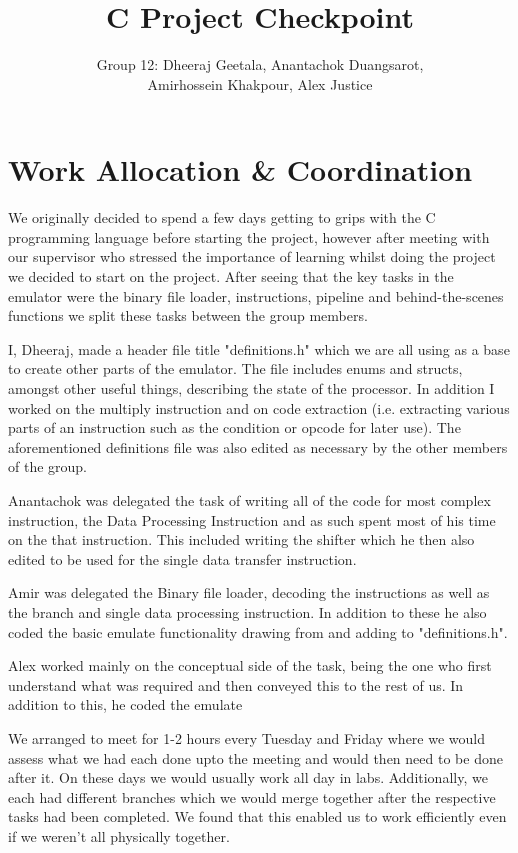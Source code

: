 \documentclass[a4paper,12pt]{article}
\begin{document}
\title{ C Project Checkpoint }
\author{Group 12: Dheeraj Geetala, Anantachok Duangsarot, \\Amirhossein Khakpour, Alex Justice}
\predate{}
\date{}
\postdate{}
\maketitle

\section{Work Allocation \& Coordination}
We originally decided to spend a few days getting to grips with the C programming language before starting the project, however after meeting with our supervisor who stressed the importance of learning whilst doing the project we decided to start on the project. After seeing that the key tasks in the emulator were the binary file loader, instructions, pipeline and behind-the-scenes functions we split these tasks between the group members.

I, Dheeraj, made a header file title "definitions.h" which we are all using as a base to create other parts of the emulator. The file includes enums and structs, amongst other useful things, describing the state of the processor. In addition I worked on the multiply instruction and on code extraction (i.e. extracting various parts of an instruction such as the condition or opcode for later use). The aforementioned definitions file was also edited as necessary by the other members of the group. 

Anantachok was delegated the task of writing all of the code for most complex instruction, the Data Processing Instruction and as such spent most of his time on the that instruction. This included writing the shifter which he then also edited to be used for the single data transfer instruction.

Amir was delegated the Binary file loader, decoding the instructions as well as the branch and single data processing instruction. In addition to these he also coded the basic emulate functionality drawing from and adding to "definitions.h".

Alex worked mainly on the conceptual side of the task, being the one who first understand what was required and then conveyed this to the rest of us. In addition to this, he coded the emulate 

We arranged to meet for 1-2 hours every Tuesday and Friday where we would assess what we had each done upto the meeting and would then need to be done after it. On these days we would usually work all day in labs. Additionally, we each had different branches which we would merge together after the respective tasks had been completed. We found that this enabled us to work efficiently even if we weren't all physically together.
\end{document}
